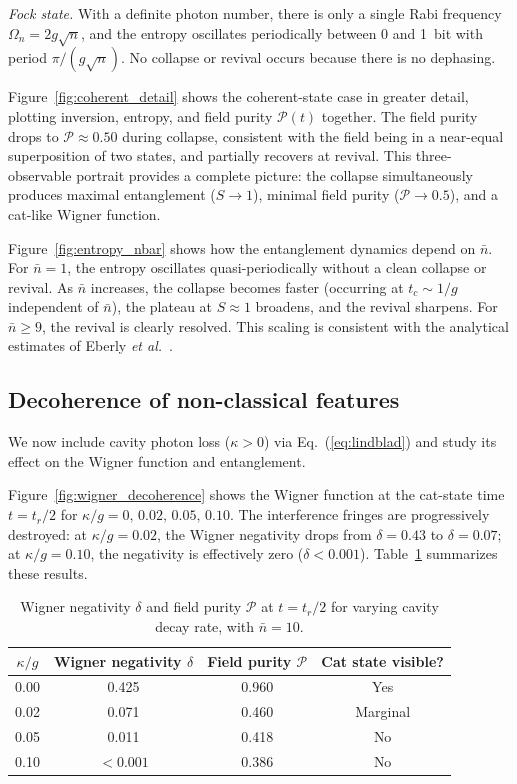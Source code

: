 \documentclass[%
 reprint,
 amsmath,amssymb,
 aps,
]{revtex4-2}
\begin{document}
\textit{Fock state.} With a definite photon number, there is only a single Rabi frequency $\Omega_n = 2g\sqrt{n}$, and the entropy oscillates periodically between 0 and 1~bit with period $\pi/(g\sqrt{n})$. No collapse or revival occurs because there is no dephasing.

Figure~\ref{fig:coherent_detail} shows the coherent-state case in greater detail, plotting inversion, entropy, and field purity $\mathcal{P}(t)$ together. The field purity drops to $\mathcal{P} \approx 0.50$ during collapse, consistent with the field being in a near-equal superposition of two states, and partially recovers at revival. This three-observable portrait provides a complete picture: the collapse simultaneously produces maximal entanglement ($S \to 1$), minimal field purity ($\mathcal{P} \to 0.5$), and a cat-like Wigner function.

Figure~\ref{fig:entropy_nbar} shows how the entanglement dynamics depend on $\bar{n}$. For $\bar{n} = 1$, the entropy oscillates quasi-periodically without a clean collapse or revival. As $\bar{n}$ increases, the collapse becomes faster (occurring at $t_c \sim 1/g$ independent of $\bar{n}$), the plateau at $S \approx 1$ broadens, and the revival sharpens. For $\bar{n} \geq 9$, the revival is clearly resolved. This scaling is consistent with the analytical estimates of Eberly \textit{et al.}~\cite{eberly1980}.


\subsection{Decoherence of non-classical features}
\label{sec:decoherence}

We now include cavity photon loss ($\kappa > 0$) via Eq.~(\ref{eq:lindblad}) and study its effect on the Wigner function and entanglement.

Figure~\ref{fig:wigner_decoherence} shows the Wigner function at the cat-state time $t = t_r/2$ for $\kappa/g = 0,\, 0.02,\, 0.05,\, 0.10$. The interference fringes are progressively destroyed: at $\kappa/g = 0.02$, the Wigner negativity drops from $\delta = 0.43$ to $\delta = 0.07$; at $\kappa/g = 0.10$, the negativity is effectively zero ($\delta < 0.001$). Table~\ref{tab:decoherence} summarizes these results.

\begin{table}[h]
\centering
\caption{Wigner negativity $\delta$ and field purity $\mathcal{P}$ at $t = t_r/2$ for varying cavity decay rate, with $\bar{n} = 10$.}
\label{tab:decoherence}
\begin{tabular}{cccc}
\hline\hline
$\kappa/g$ & Wigner negativity $\delta$ & Field purity $\mathcal{P}$ & Cat state visible? \\
\hline
0.00 & 0.425 & 0.960 & Yes \\
0.02 & 0.071 & 0.460 & Marginal \\
0.05 & 0.011 & 0.418 & No \\
0.10 & $<0.001$ & 0.386 & No \\
\hline\hline
\end{tabular}
\end{table}
\end{document}
